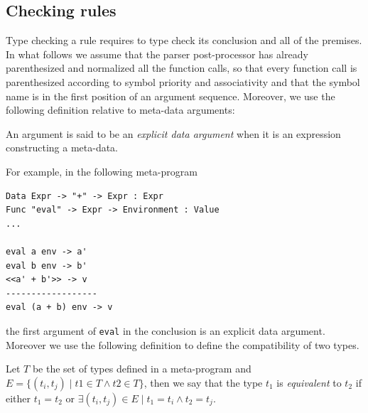 \subsection{Checking rules}
Type checking a rule requires to type check its conclusion and all of the premises. In what follows we assume that the parser post-processor has already parenthesized and normalized all the function calls, so that every function call is parenthesized according to symbol priority and associativity and that the symbol name is in the first position of an argument sequence. Moreover, we use the following definition relative to meta-data arguments:

\begin{definition}
	An argument is said to be an \textit{explicit data argument} when it is an expression constructing a meta-data.
\end{definition}

\noindent
For example, in the following meta-program

\begin{lstlisting}[caption = Example of an explicit data argument in Metacasanova,  label = code:ch_metacasanova_explicit_data_argument]
Data Expr -> "+" -> Expr : Expr
Func "eval" -> Expr -> Environment : Value
...

eval a env -> a'
eval b env -> b'
<<a' + b'>> -> v
------------------
eval (a + b) env -> v
\end{lstlisting}

\noindent
the first argument of \texttt{eval} in the conclusion is an explicit data argument. Moreover we use the following definition to define the compatibility of two types.

\begin{definition}
\label{def:ch_metacasanova_type_equivalence}
	Let $T$ be the set of types defined in a meta-program and $E = \lbrace (t_i,t_j) \; | \; t1 \in T \wedge t2 \in T \rbrace$, then we say that the type $t_1$ is \textit{equivalent} to $t_2$ if either $t_1 = t_2$ or $\exists (t_i,t_j) \in E \; | \; t_1 = t_i \wedge t_2 = t_j$.
\end{definition}

